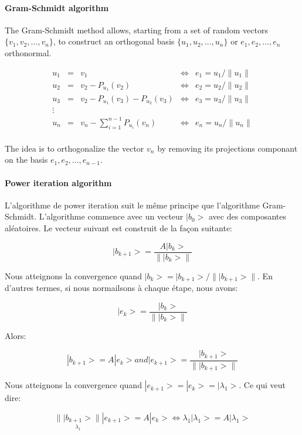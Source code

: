 \paragraph{Gram-Schmidt algorithm}{ The Gram-Schmidt method allows, starting from a set of random vectors $\{v_{1}, v_{2}, \dots, v_{n}\}$, to construct an orthogonal basis $\{u_{1}, u_{2}, \dots, u_{n}\}$ or $e_{1}, e_{2}, \dots, e_{n}$ orthonormal.

$$
\begin{array}{rclcl}
u_{1} & = & v_{1} & \Leftrightarrow& e_{1} = u_{1} / \| u_{1} \| \\
u_{2} & = & v_{2} - P_{u_{1}}(v_{2})& \Leftrightarrow& e_{2} = u_{2} / \| u_{2} \| \\
u_{3} & = & v_{2} - P_{u_{1}}(v_{3}) - P_{u_{2}}(v_{3})& \Leftrightarrow& e_{3} = u_{3} / \| u_{3} \| \\
\vdots &&&& \\
u_{n} & = & v_{n} - \sum_{i = 1}^{n-1} P_{u_{i}}(v_{n})& \Leftrightarrow& e_{n} = u_{n} / \| u_{n} \| \\
\end{array}
$$

The idea is to orthogonalize the vector $v_{n}$ by removing its projections componant on the basis $e_{1}, e_{2}, \dots, e_{n-1}$.
}

\paragraph{Power iteration algorithm}{

L'algorithme de power iteration suit le même principe que l'algorithme Gram-Schmidt. L'algorithme commence avec un vecteur $| b_{0} >$ avec des composantes aléatoires. Le vecteur suivant est construit de la façon suitante:

$$
| b_{k+1} > = \frac{A | b_{k} >}{\|| b_{k} >\|}
$$

Nous atteignons la convergence quand $| b_{k} > = | b_{k+1} > / \| | b_{k+1} > \|$. En d'autres termes, si nous normailsons à chaque étape, nous avons:

$$
| e_{k} > = \frac{| b_{k} > }{ \| | b_{k} > \|}
$$

Alors:

$$
| b_{k+1} > = A | e_{k} > and | e_{k+1} > = \frac{| b_{k+1} > }{ \| | b_{k+1} > \|}
$$

Nous atteignons la convergence quand $| e_{k+1} > = | e_{k} > = | \lambda_{1} >$.  Ce qui veut dire:

$$
\underset{\lambda_{1}}{\| | b_{k+1} > \|}| e_{k+1} > = A| e_{k} > \Leftrightarrow \lambda_{1} | \lambda_{1} > = A| \lambda_{1} >
$$
}

